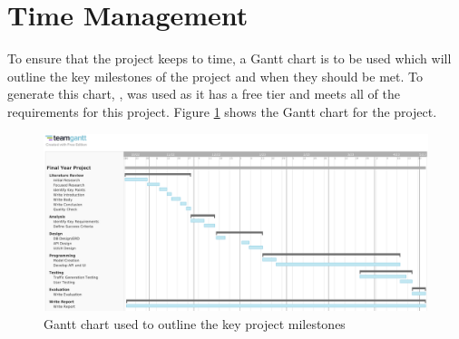 \section{Time Management}
\label{methodology:time-management}
To ensure that the project keeps to time, a Gantt chart is to be used which will outline the key milestones of the project and when they should be met. To generate this chart, \cite{teamgantt}, was used as it has a free tier and meets all of the requirements for this project. Figure \ref{fig:gantt-chart} shows the Gantt chart for the project.
\begin{figure}[H]
    \centering
    \includegraphics[scale=0.2]{images/gantt-chart.png}
    \caption{Gantt chart used to outline the key project milestones}
    \label{fig:gantt-chart}
\end{figure}